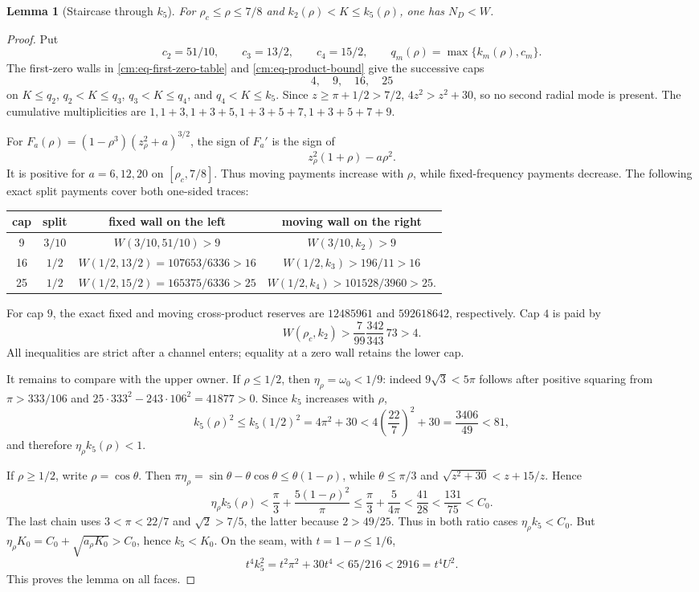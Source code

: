 \documentclass[11pt]{article}
\numberwithin{equation}{section}
\newtheorem{lemma}[theorem]{Lemma}
\theoremstyle{definition}
\theoremstyle{remark}
\begin{document}
\begin{lemma}[Staircase through \(k_5\)]
\label{cm:lem-k5}
For \(\rho_c\leq\rho\leq7/8\) and
\(k_2(\rho)<K\leq k_5(\rho)\), one has \(N_D<W\).
\end{lemma}

\begin{proof}
Put
\[
 c_2=51/10,\qquad c_3=13/2,\qquad c_4=15/2,
 \qquad q_m(\rho)=\max\{k_m(\rho),c_m\}.
\]
The first-zero walls in \eqref{cm:eq-first-zero-table} and
\eqref{cm:eq-product-bound} give the successive caps
\[
 4,\quad 9,\quad 16,\quad 25
\]
on \(K\leq q_2\), \(q_2<K\leq q_3\),
\(q_3<K\leq q_4\), and \(q_4<K\leq k_5\).  Since
\(z\geq\pi+1/2>7/2\), \(4z^2>z^2+30\), so no second radial mode is
present.  The cumulative multiplicities are
\(1,1+3,1+3+5,1+3+5+7,1+3+5+7+9\).

For \(F_a(\rho)=(1-\rho^3)(z_\rho^2+a)^{3/2}\), the sign of
\(F_a'\) is the sign of
\[
 z_\rho^2(1+\rho)-a\rho^2.
\]
It is positive for \(a=6,12,20\) on \([\rho_c,7/8]\).  Thus moving
payments increase with \(\rho\), while fixed-frequency payments decrease.
The following exact split payments cover both one-sided traces:
\begin{center}
\small
\begin{tabular}{c|c|c|c}
cap&split&fixed wall on the left&moving wall on the right\\ \hline
9&\(3/10\)&\(W(3/10,51/10)>9\)&\(W(3/10,k_2)>9\)\\
16&\(1/2\)&\(W(1/2,13/2)=107653/6336>16\)&\(W(1/2,k_3)>196/11>16\)\\
25&\(1/2\)&\(W(1/2,15/2)=165375/6336>25\)&\(W(1/2,k_4)>101528/3960>25\).
\end{tabular}
\end{center}
For cap \(9\), the exact fixed and moving cross-product reserves are
\(12485961\) and \(592618642\), respectively.  Cap \(4\) is paid by
\[
 W(\rho_c,k_2)>\frac7{99}\frac{342}{343}\,73>4.
\]
All inequalities are strict after a channel enters; equality at a zero wall
retains the lower cap.

It remains to compare with the upper owner.  If \(\rho\leq1/2\), then
\(\eta_\rho=\omega_0<1/9\): indeed \(9\sqrt3<5\pi\) follows after
positive squaring from \(\pi>333/106\) and
\(25\cdot333^2-243\cdot106^2=41877>0\).  Since \(k_5\) increases with
\(\rho\),
\[
 k_5(\rho)^2\leq k_5(1/2)^2=4\pi^2+30
 <4\left(\frac{22}{7}\right)^2+30
 =\frac{3406}{49}<81,
\]
and therefore \(\eta_\rho k_5(\rho)<1\).

If \(\rho\geq1/2\), write \(\rho=\cos\theta\).  Then
\(\pi\eta_\rho=\sin\theta-\theta\cos\theta
\leq\theta(1-\rho)\), while \(\theta\leq\pi/3\) and
\(\sqrt{z^2+30}<z+15/z\).  Hence
\[
 \eta_\rho k_5(\rho)
 <\frac\pi3+\frac{5(1-\rho)^2}{\pi}
 \leq\frac\pi3+\frac5{4\pi}
 <\frac{41}{28}<\frac{131}{75}<C_0.
\]
The last chain uses \(3<\pi<22/7\) and
\(\sqrt2>7/5\), the latter because \(2>49/25\).  Thus in both ratio cases
\(\eta_\rho k_5<C_0\).
But \(\eta_\rho K_0=C_0+\sqrt{a_\rho K_0}>C_0\), hence
\(k_5<K_0\).  On the seam, with \(t=1-\rho\leq1/6\),
\[
 t^4k_5^2=t^2\pi^2+30t^4<65/216<2916=t^4U^2.
\]
This proves the lemma on all faces.
\end{proof}
\end{document}
